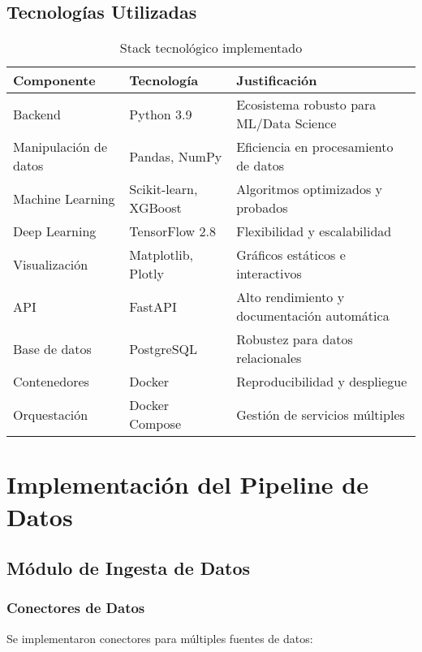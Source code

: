 \subsection{Tecnologías Utilizadas}

\begin{table}[htbp]
\centering
\caption{Stack tecnológico implementado}
\begin{tabular}{@{}p{3cm}p{4cm}p{6cm}@{}}
\toprule
\textbf{Componente} & \textbf{Tecnología} & \textbf{Justificación} \\
\midrule
Backend & Python 3.9 & Ecosistema robusto para ML/Data Science \\
Manipulación de datos & Pandas, NumPy & Eficiencia en procesamiento de datos \\
Machine Learning & Scikit-learn, XGBoost & Algoritmos optimizados y probados \\
Deep Learning & TensorFlow 2.8 & Flexibilidad y escalabilidad \\
Visualización & Matplotlib, Plotly & Gráficos estáticos e interactivos \\
API & FastAPI & Alto rendimiento y documentación automática \\
Base de datos & PostgreSQL & Robustez para datos relacionales \\
Contenedores & Docker & Reproducibilidad y despliegue \\
Orquestación & Docker Compose & Gestión de servicios múltiples \\
\bottomrule
\end{tabular}
\label{tab:stack_tecnologico}
\end{table}

\section{Implementación del Pipeline de Datos}

\subsection{Módulo de Ingesta de Datos}

\subsubsection{Conectores de Datos}

Se implementaron conectores para múltiples fuentes de datos:

